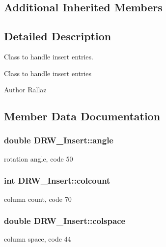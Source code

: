 \subsection*{Additional Inherited Members}


\subsection{Detailed Description}
Class to handle insert entries. 

Class to handle insert entries \begin{DoxyAuthor}{Author}
Rallaz 
\end{DoxyAuthor}


\subsection{Member Data Documentation}
\hypertarget{class_d_r_w___insert_ad685a40847d4a5a8458ecaff2ccc4f3d}{}
\subsubsection[{angle}]{\setlength{\rightskip}{0pt plus 5cm}double D\+R\+W\+\_\+\+Insert\+::angle}\label{class_d_r_w___insert_ad685a40847d4a5a8458ecaff2ccc4f3d}
rotation angle, code 50 \hypertarget{class_d_r_w___insert_acd0f0491349b2159c6009634f883c3e7}{}
\subsubsection[{colcount}]{\setlength{\rightskip}{0pt plus 5cm}int D\+R\+W\+\_\+\+Insert\+::colcount}\label{class_d_r_w___insert_acd0f0491349b2159c6009634f883c3e7}
column count, code 70 \hypertarget{class_d_r_w___insert_a4fe4d62a16d3288286004aa8dd49acb6}{}
\subsubsection[{colspace}]{\setlength{\rightskip}{0pt plus 5cm}double D\+R\+W\+\_\+\+Insert\+::colspace}\label{class_d_r_w___insert_a4fe4d62a16d3288286004aa8dd49acb6}
column space, code 44 \hypertarget{class_d_r_w___insert_aac767b55f89a1ba2f95a01573dde4302}{}
